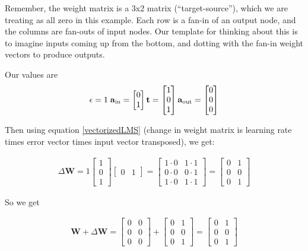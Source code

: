 Remember, the weight matrix is a 3x2 matrix  (``target-source''), which we are treating as all zero in this example. Each row is a fan-in of an output node, and the columns are fan-outs of input nodes. Our template for thinking about this is to imagine inputs coming up from the bottom, and dotting with the fan-in weight vectors to produce outputs.

Our values are
\begin{equation*}
\epsilon = 1 \; \; \\
\mathbf{a}_{\text{in}} = \begin{bmatrix} 0 \\ 1 \end{bmatrix} \\
\mathbf{t} = \begin{bmatrix} 1 \\ 0 \\ 1 \end{bmatrix}
\mathbf{a}_{\text{out}} = \begin{bmatrix} 0 \\ 0 \\ 0 \end{bmatrix}
\end{equation*}

Then using equation \eqref{vectorizedLMS} (change in weight matrix is learning rate times error vector times input vector transposed), we get:

\begin{align*}
\Delta \mathbf{W}  = 1
\begin{bmatrix} 1 \\ 0 \\ 1 \end{bmatrix} 
\begin{bmatrix} 0 & 1 \end{bmatrix} 
= \begin{bmatrix} 1 \cdot 0 & 1 \cdot 1 \\ 0 \cdot 0 & 0 \cdot 1 \\ 1 \cdot 0 & 1 \cdot 1 \end{bmatrix} 
= \begin{bmatrix} 0 & 1 \\ 0 & 0 \\  0 & 1  \end{bmatrix}
\end{align*}

So we get

\begin{align*}
\mathbf{W} + \Delta \mathbf{W}  =
\begin{bmatrix} 0 & 0 \\ 0 & 0 \\  0  & 0  \end{bmatrix} +
\begin{bmatrix} 0 & 1 \\ 0 & 0 \\  0  & 1  \end{bmatrix} =
\begin{bmatrix} 0 & 1 \\ 0 & 0 \\  0  & 1  \end{bmatrix}
\end{align*}

